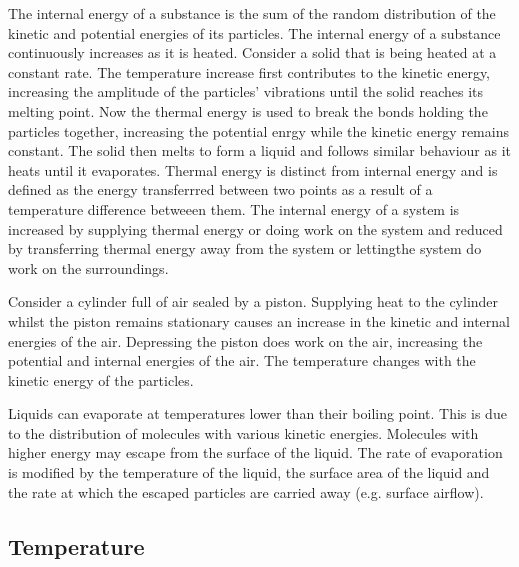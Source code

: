 \documentclass[a4,8pt]{article}
\begin{document}
The internal energy of a substance is the sum of the random distribution of the kinetic and potential energies of its particles. The internal energy of a substance continuously increases as it is heated. Consider a solid that is being heated at a constant rate. The temperature increase first contributes to the kinetic energy, increasing the amplitude of the particles' vibrations until the solid reaches its melting point. Now the thermal energy is used to break the bonds holding the particles together, increasing the potential enrgy while the kinetic energy remains constant. The solid then melts to form a liquid and follows similar behaviour as it heats until it evaporates. Thermal energy is distinct from internal energy and is defined as the energy transferrred between two points as a result of a temperature difference betweeen them. The internal energy of a system is increased by supplying thermal energy or doing work on the system and reduced by transferring thermal energy away from the system or lettingthe system do work on the surroundings.

Consider a cylinder full of air sealed by a piston. Supplying heat to the cylinder whilst the piston remains stationary causes an increase in the kinetic and internal energies of the air. Depressing the piston does work on the air, increasing the potential and internal energies of the air. The temperature changes with the kinetic energy of the particles.

Liquids can evaporate at temperatures lower than their boiling point. This is due to the distribution of molecules with various kinetic energies. Molecules with higher energy may escape from the surface of the liquid. The rate of evaporation is modified by the temperature of the liquid, the surface area of the liquid and the rate at which the escaped particles are carried away (e.g. surface airflow).

\subsection{Temperature}
 
\end{document}
